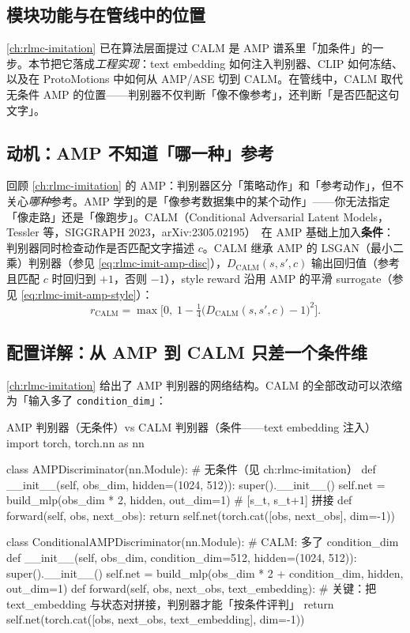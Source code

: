 \subsection{模块功能与在管线中的位置}
\label{sec:rlmc-mm-calm-pos}

\cref{ch:rlmc-imitation} 已在算法层面提过 CALM 是 AMP 谱系里「加条件」的一步。本节把它落成\emph{工程实现}：text embedding 如何注入判别器、CLIP 如何冻结、以及在 ProtoMotions 中如何从 AMP/ASE 切到 CALM。在管线中，CALM 取代无条件 AMP 的位置——判别器不仅判断「像不像参考」，还判断「是否匹配这句文字」。

\subsection{动机：AMP 不知道「哪一种」参考}
\label{sec:rlmc-mm-calm-motivation}

回顾 \cref{ch:rlmc-imitation} 的 AMP：判别器区分「策略动作」和「参考动作」，但不关心\emph{哪种}参考。AMP 学到的是「像参考数据集中的某个动作」——你无法指定「像走路」还是「像跑步」。CALM（Conditional Adversarial Latent Models，Tessler 等，SIGGRAPH 2023，arXiv:2305.02195）\,\cite{tessler2023calm} 在 AMP 基础上加入\textbf{条件}：判别器同时检查动作是否匹配文字描述 $c$。CALM 继承 AMP 的 LSGAN（最小二乘）判别器（参见 \cref{eq:rlmc-imit-amp-disc}），$D_{\mathrm{CALM}}(s,s',c)$ 输出回归值（参考且匹配 $c$ 时回归到 $+1$，否则 $-1$），style reward 沿用 AMP 的平滑 surrogate（参见 \cref{eq:rlmc-imit-amp-style}）：
\begin{equation}
r_{\mathrm{CALM}} = \max\!\Big[0,\; 1 - \tfrac14\big(D_{\mathrm{CALM}}(s, s', c) - 1\big)^2\Big].
\label{eq:rlmc-mm-calm-reward}
\end{equation}

\subsection{配置详解：从 AMP 到 CALM 只差一个条件维}
\label{sec:rlmc-mm-calm-config}

\cref{ch:rlmc-imitation} 给出了 AMP 判别器的网络结构。CALM 的全部改动可以浓缩为「输入多了 \verb|condition_dim|」：

\begin{codebox}[Python]{AMP 判别器（无条件）vs CALM 判别器（条件——text embedding 注入）}
import torch, torch.nn as nn

class AMPDiscriminator(nn.Module):           # 无条件（见 ch:rlmc-imitation）
    def __init__(self, obs_dim, hidden=(1024, 512)):
        super().__init__()
        self.net = build_mlp(obs_dim * 2, hidden, out_dim=1)   # [s_t, s_{t+1}] 拼接
    def forward(self, obs, next_obs):
        return self.net(torch.cat([obs, next_obs], dim=-1))

class ConditionalAMPDiscriminator(nn.Module):  # CALM: 多了 condition_dim
    def __init__(self, obs_dim, condition_dim=512, hidden=(1024, 512)):
        super().__init__()
        self.net = build_mlp(obs_dim * 2 + condition_dim, hidden, out_dim=1)
    def forward(self, obs, next_obs, text_embedding):
        # 关键：把 text_embedding 与状态对拼接，判别器才能「按条件评判」
        return self.net(torch.cat([obs, next_obs, text_embedding], dim=-1))
\end{codebox}

